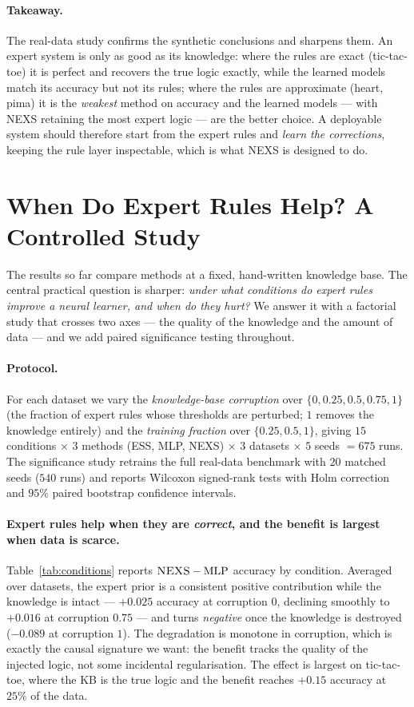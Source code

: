 \documentclass[11pt]{article}
\newcommand{\nexs}{\textsc{NEXS}}
\begin{document}
\paragraph{Takeaway.}
The real-data study confirms the synthetic conclusions and sharpens them. An
expert system is only as good as its knowledge: where the rules are exact
(tic-tac-toe) it is perfect and recovers the true logic exactly, while the
learned models match its accuracy but not its rules; where the rules are
approximate (heart, pima) it is the \emph{weakest} method on accuracy and the
learned models --- with \nexs{} retaining the most expert logic --- are the
better choice. A deployable system should therefore start from the expert rules
and \emph{learn the corrections}, keeping the rule layer inspectable, which is
what \nexs{} is designed to do.

\section{When Do Expert Rules Help? A Controlled Study}
\label{sec:whenhelp}
The results so far compare methods at a fixed, hand-written knowledge base. The
central practical question is sharper: \emph{under what conditions do expert rules
improve a neural learner, and when do they hurt?} We answer it with a factorial
study that crosses two axes --- the quality of the knowledge and the amount of
data --- and we add paired significance testing throughout.

\paragraph{Protocol.}
For each dataset we vary the \emph{knowledge-base corruption} over
$\{0, 0.25, 0.5, 0.75, 1\}$ (the fraction of expert rules whose thresholds are
perturbed; $1$ removes the knowledge entirely) and the \emph{training fraction}
over $\{0.25, 0.5, 1\}$, giving $15$ conditions $\times$ $3$ methods
(ESS, MLP, \nexs{}) $\times$ $3$ datasets $\times$ $5$ seeds $=675$ runs. The
significance study retrains the full real-data benchmark with $20$ matched seeds
($540$ runs) and reports Wilcoxon signed-rank tests with Holm correction and
$95\%$ paired bootstrap confidence intervals.

\paragraph{Expert rules help when they are \emph{correct}, and the benefit is
largest when data is scarce.}
Table~\ref{tab:conditions} reports $\nexs{} - \text{MLP}$ accuracy by condition.
Averaged over datasets, the expert prior is a consistent positive contribution
while the knowledge is intact --- $+0.025$ accuracy at corruption $0$, declining
smoothly to $+0.016$ at corruption $0.75$ --- and turns \emph{negative} once the
knowledge is destroyed ($-0.089$ at corruption $1$). The degradation is
monotone in corruption, which is exactly the causal signature we want: the
benefit tracks the quality of the injected logic, not some incidental
regularisation. The effect is largest on tic-tac-toe, where the KB is the true
logic and the benefit reaches $+0.15$ accuracy at $25\%$ of the data.
\end{document}
